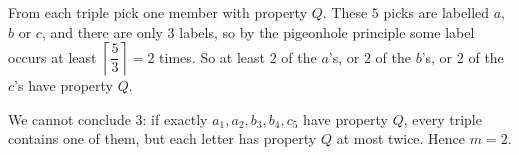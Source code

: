 From each triple pick one member with property $Q$. These $5$ picks are labelled $a$, $b$ or $c$, and there are only $3$ labels, so by the pigeonhole principle some label occurs at least $\left\lceil\dfrac{5}{3}\right\rceil=2$ times. So at least $2$ of the $a$'s, or $2$ of the $b$'s, or $2$ of the $c$'s have property $Q$.

We cannot conclude $3$: if exactly $a_1,a_2,b_3,b_4,c_5$ have property $Q$, every triple contains one of them, but each letter has property $Q$ at most twice. Hence $m=\boxed{2}$.
